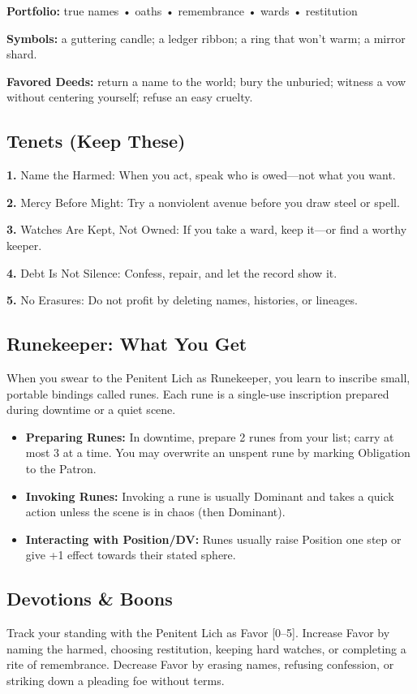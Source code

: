 \documentclass[18pt, letterpaper, twoside]{article}
\newcommand{\tenet}[2]{\noindent\textbf{#1.} #2\par}
\begin{document}
\begin{enumerate}
\textbf{Portfolio:} true names • oaths • remembrance • wards • restitution

\textbf{Symbols:} a guttering candle; a ledger ribbon; a ring that won't warm; a mirror shard.

\textbf{Favored Deeds:} return a name to the world; bury the unburied; witness a vow without centering yourself; refuse an easy cruelty.

\subsection{Tenets (Keep These)}
\tenet{1}{Name the Harmed: When you act, speak who is owed---not what you want.}
\tenet{2}{Mercy Before Might: Try a nonviolent avenue before you draw steel or spell.}
\tenet{3}{Watches Are Kept, Not Owned: If you take a ward, keep it---or find a worthy keeper.}
\tenet{4}{Debt Is Not Silence: Confess, repair, and let the record show it.}
\tenet{5}{No Erasures: Do not profit by deleting names, histories, or lineages.}

\subsection{Runekeeper: What You Get}

When you swear to the Penitent Lich as Runekeeper, you learn to inscribe small, portable bindings called runes. Each rune is a single-use inscription prepared during downtime or a quiet scene.
\begin{itemize}
    \item \textbf{Preparing Runes:} In downtime, prepare 2 runes from your list; carry at most 3 at a time. You may overwrite an unspent rune by marking Obligation to the Patron.
    \item \textbf{Invoking Runes:} Invoking a rune is usually Dominant and takes a quick action unless the scene is in chaos (then Dominant).
    \item \textbf{Interacting with Position/DV:} Runes usually raise Position one step or give +1 effect towards their stated sphere.
\end{itemize}

\subsection{Devotions \& Boons}

Track your standing with the Penitent Lich as Favor [0--5]. Increase Favor by naming the harmed, choosing restitution, keeping hard watches, or completing a rite of remembrance. Decrease Favor by erasing names, refusing confession, or striking down a pleading foe without terms.


\end{enumerate}
\end{document}
